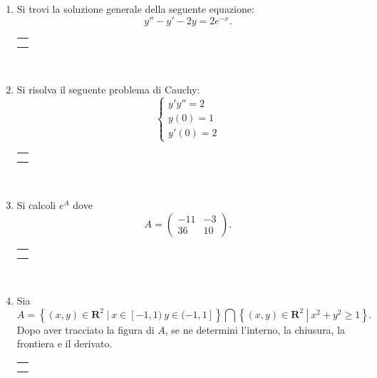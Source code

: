 \documentclass[12pt,a4paper]{report}\pagenumbering{roman}
\begin{document}
\begin{enumerate}
\item Si trovi la soluzione generale della seguente equazione:
$$y''-y'-2y=2e^{-x}.$$
\hspace*{-3.5cm}\begin{tabular}{c}\hline\\\hspace*{15.7cm}\end{tabular}\\
\hspace*{-3.5cm}{\textbf SVOLGIMENTO:}\pagebreak

\item Si risolva il seguente problema di Cauchy:
$$\left\{\begin{array}{l} y'y''=2 \\ y(0)=1\\ y'(0)=2
\end{array}\right.$$
\hspace*{-3.5cm}\begin{tabular}{c}\hline\\\hspace*{15.7cm}\end{tabular}\\
\hspace*{-3.5cm}{\textbf SVOLGIMENTO:}\pagebreak

\item Si calcoli $e^A$ dove 
$$A=\left(\begin{array}{cc}
-11 & -3 \\
 36 & 10
\end{array}\right).$$

\hspace*{-3.5cm}\begin{tabular}{c}\hline\\\hspace*{15.7cm}\end{tabular}\\
\hspace*{-3.5cm}{\textbf SVOLGIMENTO:}\pagebreak
\item Sia 
$$A=\left\{(x,y)\in{\mathbf R}^2\ \left|\ x\in[-1,1)\ y\in(-1,1]\right.\right\}\bigcap
\left\{(x,y)\in{\mathbf R}^2\ \left|\ x^2+y^2\geq1\right.\right\}.$$ 
Dopo aver tracciato la figura di $A$, se ne determini
l'interno, la chiusura, la frontiera e il derivato.

\hspace*{-3.5cm}\begin{tabular}{c}\hline\\\hspace*{15.7cm}\end{tabular}\\
\hspace*{-3.5cm}{\textbf SVOLGIMENTO:}\pagebreak


\end{enumerate}
\end{document}
